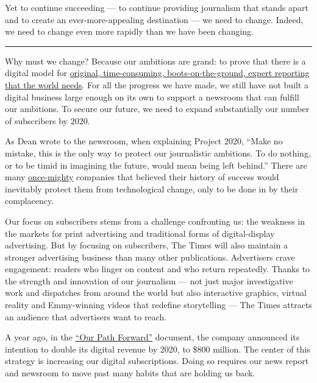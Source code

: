 Yet to continue succeeding --- to continue providing journalism that
stands apart and to create an ever-more-appealing destination --- we
need to change. Indeed, we need to change even more rapidly than we have
been changing.

\begin{center}\rule{0.5\linewidth}{\linethickness}\end{center}

 Why must we change? Because our ambitions are grand: to prove that
there is a digital model for
\href{https://www.nytimes3xbfgragh.onion/video/multimedia/100000003957700/the-times-celebrates-a-milestone.html}{original,
time-consuming, boots-on-the-ground, expert reporting that the world
needs}. For all the progress we have made, we still have not built a
digital business large enough on its own to support a newsroom that can
fulfill our ambitions. To secure our future, we need to expand
substantially our number of subscribers by 2020.

As Dean wrote to the newsroom, when explaining Project 2020, ``Make no
mistake, this is the only way to protect our journalistic ambitions. To
do nothing, or to be timid in imagining the future, would mean being
left behind.'' There are many
\href{https://www.nytimes3xbfgragh.onion/interactive/business/kodak-timeline.html}{once-mighty}
companies that believed their history of success would inevitably
protect them from technological change, only to be done in by their
complacency.

Our focus on subscribers stems from a challenge confronting us: the
weakness in the markets for print advertising and traditional forms of
digital-display advertising. But by focusing on subscribers, The Times
will also maintain a stronger advertising business than many other
publications. Advertisers crave engagement: readers who linger on
content and who return repeatedly. Thanks to the strength and innovation
of our journalism --- not just major investigative work and dispatches
from around the world but also interactive graphics, virtual reality and
Emmy-winning videos that redefine storytelling --- The Times attracts an
audience that advertisers want to reach.

A year ago, in the
\href{http://www.nytco.com/wp-content/uploads/Our-Path-Forward.pdf}{``Our
Path Forward''} document, the company announced its intention to double
its digital revenue by 2020, to \$800 million. The center of this
strategy is increasing our digital subscriptions. Doing so requires our
news report and newsroom to move past many habits that are holding us
back.

